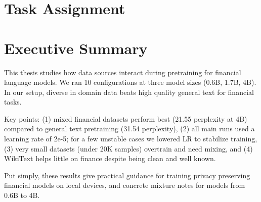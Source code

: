 \documentclass[11pt,a4paper,english,oneside]{book}
\begin{document}
\thispagestyle{empty}
\titleGP

\newpage

\setcounter{page}{1}

\section*{Task Assignment}
\thispagestyle{firststyle}
\newpage

\section*{Executive Summary}
\thispagestyle{firststyle}

This thesis studies how data sources interact during pretraining for financial language models. We ran 10 configurations at three model sizes (0.6B, 1.7B, 4B). In our setup, diverse in domain data beats high quality general text for financial tasks.

Key points: (1) mixed financial datasets perform best (21.55 perplexity at 4B) compared to general text pretraining (31.54 perplexity), (2) all main runs used a learning rate of 2e-5; for a few unstable cases we lowered LR to stabilize training, (3) very small datasets (under 20K samples) overtrain and need mixing, and (4) WikiText helps little on finance despite being clean and well known.

Put simply, these results give practical guidance for training privacy preserving financial models on local devices, and concrete mixture notes for models from 0.6B to 4B.

\newpage

\tableofcontents
\listoffigures
\listoftables
\end{document}
